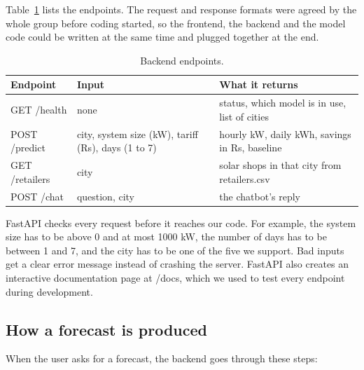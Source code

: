 Table~\ref{tab:endpoints} lists the endpoints. The request and response formats were agreed by the whole group before coding started, so the frontend, the backend and the model code could be written at the same time and plugged together at the end.

\begin{table}[H]
\centering
\small
\begin{tabular}{p{2.7cm}p{5.2cm}p{6.6cm}}
\toprule
Endpoint & Input & What it returns \\
\midrule
GET /health & none & status, which model is in use, list of cities \\
POST /predict & city, system size (kW), tariff (Rs), days (1 to 7) & hourly kW, daily kWh, savings in Rs, baseline \\
GET /retailers & city & solar shops in that city from retailers.csv \\
POST /chat & question, city & the chatbot's reply \\
\bottomrule
\end{tabular}
\caption{Backend endpoints.}
\label{tab:endpoints}
\end{table}

FastAPI checks every request before it reaches our code. For example, the system size has to be above 0 and at most 1000 kW, the number of days has to be between 1 and 7, and the city has to be one of the five we support. Bad inputs get a clear error message instead of crashing the server. FastAPI also creates an interactive documentation page at /docs, which we used to test every endpoint during development.

\subsection{How a forecast is produced}

When the user asks for a forecast, the backend goes through these steps:

